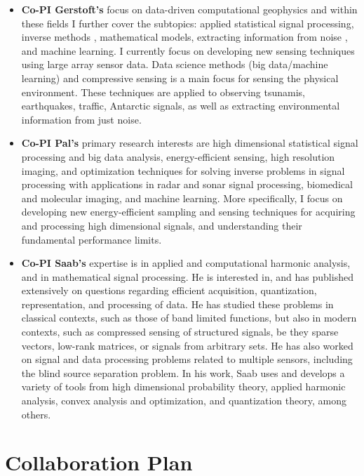 \documentclass{article}
\begin{document}
\begin{itemize}
\item {\bf Co-PI Gerstoft's} focus on data-driven computational geophysics and within these fields I further cover the subtopics: applied statistical signal processing, inverse methods \cite{gerstoft1994}, mathematical models, extracting information from noise \cite{sabra2005,gerstoft2006}, and machine learning\cite{niu2017source,kong2018}. I currently focus on developing new sensing techniques using large array sensor data. Data science methods (big data/machine learning) and compressive sensing\cite{XenakiCS:2014,Gerstoft2015} is a main focus for sensing the physical environment.  These techniques are applied to observing tsunamis, earthquakes, traffic, Antarctic signals, as well as extracting environmental information from just noise. 
\item {\bf Co-PI Pal's}  primary research interests are high dimensional statistical signal processing and big data analysis, energy-efficient sensing, high resolution imaging, and optimization techniques for solving inverse problems in signal processing with applications in radar and sonar signal processing, biomedical and molecular imaging, and machine learning. More specifically, I focus on developing new energy-efficient sampling and sensing techniques for acquiring and processing high dimensional signals, and understanding their fundamental performance limits. 
\item {\bf Co-PI Saab's} expertise is in applied and computational harmonic analysis, and in mathematical signal processing. He is interested in, and has published extensively on questions regarding efficient acquisition, quantization, representation, and processing of data. He has studied these problems in classical contexts, such as those of band limited functions, but also in modern contexts, such as compressed sensing of structured signals, be they sparse vectors, low-rank matrices, or signals from arbitrary sets. He has also worked on signal and data processing problems related to multiple sensors, including the blind source separation problem. In his work, Saab uses and develops a variety of tools from high dimensional probability theory, applied harmonic analysis, convex analysis and optimization, and quantization theory, among others. 
\end{itemize}
\vspace{1cm}

\section{Collaboration Plan}
\end{document}
